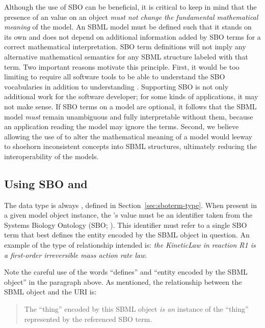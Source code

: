 Although the use of SBO can be beneficial, it is critical to keep
in mind that the presence of an  value on an object
\emph{must not change the fundamental mathematical meaning} of the
model.  An SBML model must be defined such that it stands on its
own and does not depend on additional information added by SBO
terms for a correct mathematical interpretation.  SBO term
definitions will not imply any alternative mathematical semantics
for any SBML structure labeled with that term.  Two important
reasons motivate this principle.  First, it would be too limiting
to require all software tools to be able to understand the SBO
vocabularies in addition to understanding \changed{\sbmltwothree}.
Supporting SBO is not only additional work for the software
developer; for some kinds of applications, it may not make sense.
If SBO terms on a model are optional, it follows that the SBML
model \emph{must} remain unambiguous and fully interpretable
without them, because an application reading the model may ignore
the terms.  Second, we believe allowing the use of 
to alter the mathematical meaning of a model would  leeway to shoehorn inconsistent concepts into SBML
structures, ultimately reducing the interoperability of the
models.

\subsection{Using SBO and }

The   data type is always
, defined in Section~\ref{sec:sboterm-type}.
When present in a given model object instance, the
's value must be an identifier taken from the
Systems Biology Ontology (SBO; \sboref).  This identifier must
refer to a single SBO term that best defines the entity encoded by
the SBML object in question.  An example of the type of
relationship intended is: \emph{the KineticLaw in reaction R1 is a
  first-order irreversible mass action rate law}.

Note the careful use of the words ``defines'' and ``entity encoded
by the SBML object'' in the paragraph above.  As mentioned, the
relationship between the SBML object and the URI is:

\begin{quote}
  The ``thing'' encoded by this SBML object \emph{is an} instance
  of the ``thing'' represented by the referenced SBO term.
\end{quote}


